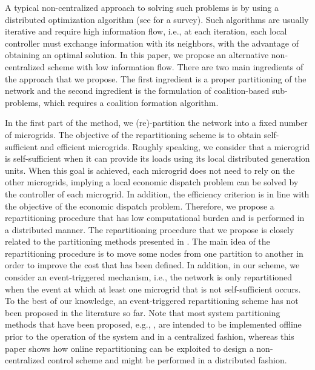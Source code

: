 A typical non-centralized approach to solving such problems is by using a distributed optimization algorithm \cite{baker2016,wang2015,kraning2014,braun2016,guo2016} (see \cite{molzahn2017,morstyn2016} for a survey).  Such algorithms are usually iterative and require high information flow, i.e., at each iteration, each local controller must exchange information with its neighbors, with the advantage of obtaining an optimal solution. In this paper, we propose an alternative non-centralized scheme with low information flow. There are two main ingredients of the approach that we propose. The first ingredient is a proper partitioning of the network and the second ingredient is the formulation of coalition-based sub-problems, which requires a coalition formation algorithm. 

In the first part of the method, we (re)-partition the network into a fixed number of microgrids. The objective of the repartitioning scheme is to obtain self-sufficient and efficient microgrids. Roughly speaking, we consider that a microgrid is self-sufficient when it can provide its loads using its local distributed generation units.  When this goal is achieved, each microgrid does not need to rely on the other microgrids, implying a local economic dispatch problem can be solved by the controller of each microgrid. In addition, the efficiency criterion is in line with the objective of the economic dispatch problem. 
Therefore, we propose a repartitioning procedure that has low computational burden and is performed in a distributed manner. %
The repartitioning procedure that we propose is closely related to the partitioning methods presented in \cite{ananduta2019a,ananduta2019,julian2019}. The main idea of the repartitioning procedure is to move some nodes from one partition to another in order to improve the cost that has been defined. In addition, in our scheme, we consider an event-triggered mechanism, i.e., the network is only repartitioned when the event at which at least one microgrid that is not self-sufficient occurs. To the best of our knowledge, an event-triggered  repartitioning scheme has not been proposed in the literature so far.  Note that most system partitioning methods that have been proposed, e.g., \cite{fjallstrom1998,guo2016,julian2017,ocampo2011}, are intended to be implemented offline prior to the operation of the system and in a centralized fashion, whereas this paper shows how online repartitioning can be exploited to design a non-centralized control scheme and might be performed in a distributed fashion.  \color{black}

